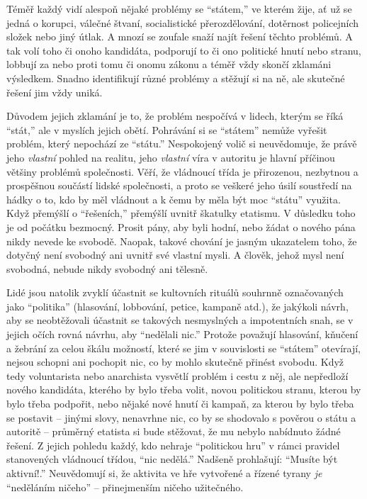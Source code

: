 \documentclass{book}
\begin{document}
Téměř každý vidí alespoň nějaké problémy se \enquote{státem,} ve kterém žije, ať už se jedná o korupci, válečné štvaní, socialistické přerozdělování, dotěrnost policejních složek nebo jiný útlak. A mnozí se zoufale snaží najít řešení těchto problémů. A tak volí toho či onoho kandidáta, podporují to či ono politické hnutí nebo stranu, lobbují za nebo proti tomu či onomu zákonu a téměř vždy skončí zklamáni výsledkem. Snadno identifikují různé problémy a stěžují si na ně, ale skutečné řešení jim vždy uniká.

Důvodem jejich zklamání je to, že problém nespočívá v lidech, kterým se říká \enquote{stát,} ale v myslích jejich obětí. Pohrávání si se \enquote{státem} nemůže vyřešit problém, který nepochází ze \enquote{státu.} Nespokojený volič si neuvědomuje, že právě jeho \emph{vlastní} pohled na realitu, jeho \emph{vlastní} víra v autoritu je hlavní příčinou většiny problémů společnosti. Věří, že vládnoucí třída je přirozenou, nezbytnou a prospěšnou součástí lidské společnosti, a proto se veškeré jeho úsilí soustředí na hádky o to, kdo by měl vládnout a k čemu by měla být moc \enquote{státu} využita. Když přemýšlí o \enquote{řešeních,} přemýšlí uvnitř škatulky etatismu. V důsledku toho je od počátku bezmocný. Prosit pány, aby byli hodní, nebo žádat o nového pána nikdy nevede ke svobodě. Naopak, takové chování je jasným ukazatelem toho, že dotyčný není svobodný ani uvnitř své vlastní mysli. A člověk, jehož mysl není svobodná, nebude nikdy svobodný ani tělesně.

Lidé jsou natolik zvyklí účastnit se kultovních rituálů souhrnně označovaných jako \enquote{politika} (hlasování, lobbování, petice, kampaně atd.), že jakýkoli návrh, aby se neobtěžovali účastnit se takových nesmyslných a impotentních snah, se v jejich očích rovná návrhu, aby \enquote{nedělali nic.} Protože považují hlasování, kňučení a žebrání za celou škálu možností, které se jim v souvislosti se \enquote{státem} otevírají, nejsou schopni ani pochopit nic, co by mohlo skutečně přinést svobodu. Když tedy voluntarista nebo anarchista vysvětlí problém i cestu z něj, ale nepředloží nového kandidáta, kterého by bylo třeba volit, novou politickou stranu, kterou by bylo třeba podpořit, nebo nějaké nové hnutí či kampaň, za kterou by bylo třeba se postavit -- jinými slovy, nenavrhne nic, co by se shodovalo s pověrou o státu a autoritě -- průměrný etatista si bude stěžovat, že mu nebylo nabídnuto žádné řešení. Z jejich pohledu každý, kdo nehraje \enquote{politickou hru} v rámci pravidel stanovených vládnoucí třídou, \enquote{nic nedělá.} Nadšeně prohlašují: \enquote{Musíte být aktivní!.} Neuvědomují si, že aktivita ve hře vytvořené a řízené tyrany \emph{je} \enquote{neděláním ničeho} -- přinejmenším ničeho užitečného.
\end{document}
